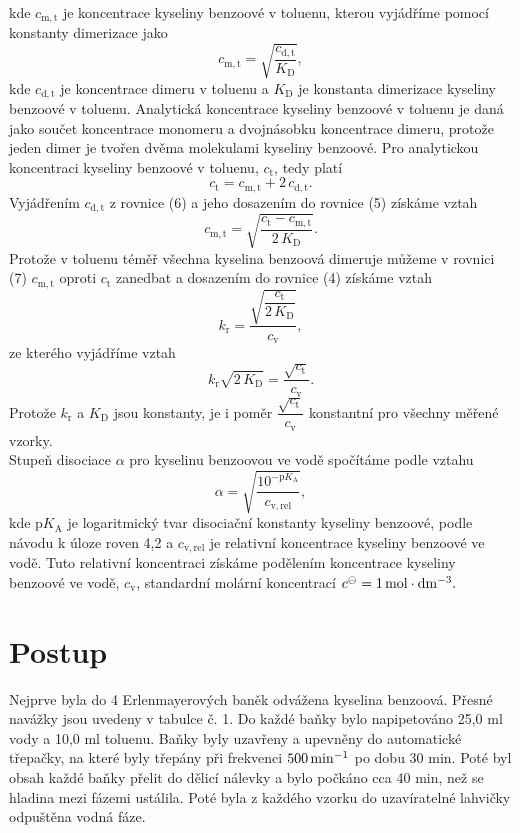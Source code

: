 \documentclass[12pt,a4paper]{article}
\def\ri#1{\mathrm{#1}}
\def\jd#1{\ifmmode\,\mathrm{#1}\else\,\textrm{#1}\fi}
\begin{document}
kde $c_\ri{m, t}$ je koncentrace kyseliny benzoové v toluenu, kterou vyjádříme pomocí konstanty dimerizace jako 
\begin{equation}
	c_\ri{m, t} = \sqrt{\dfrac{c_\ri{d, t}}{K_\ri{D}}},
\end{equation}
kde $c_\ri{d, t}$ je koncentrace dimeru v toluenu a $K_\ri{D}$ je konstanta dimerizace kyseliny benzoové v toluenu. Analytická koncentrace kyseliny benzoové v toluenu je daná jako součet koncentrace monomeru a dvojnásobku koncentrace dimeru, protože jeden dimer je tvořen dvěma molekulami kyseliny benzoové. Pro analytickou koncentraci kyseliny benzoové v toluenu, $c_\ri{t}$, tedy platí
\begin{equation}
	c_\ri{t} = c_\ri{m, t} + 2\,c_\ri{d, t}.
\end{equation}
Vyjádřením $c_\ri{d, t}$ z rovnice (6) a jeho dosazením do rovnice (5) získáme vztah
\begin{equation}
	c_\ri{m, t} = \sqrt{\dfrac{c_\ri{t}-c_\ri{m, t}}{2\,K_\ri{D}}}.
\end{equation}
Protože v toluenu téměř všechna kyselina benzoová dimeruje můžeme v rovnici (7) $c_\ri{m, t}$ oproti $c_\ri{t}$ zanedbat a dosazením do rovnice (4) získáme vztah
\begin{equation}
	k_\ri{r} = \dfrac{\sqrt{\dfrac{c_\ri{t}}{2\,K_\ri{D}}}}{c_\ri{v}},
\end{equation}
ze kterého vyjádříme vztah
\begin{equation}
	k_\ri{r}\sqrt{2\,K_\ri{D}} =  \dfrac{\sqrt{c_\ri{t}}}{c_\ri{v}}.
\end{equation}
Protože $k_\ri{r}$ a $K_\ri{D}$ jsou konstanty, je i poměr $\dfrac{\sqrt{c_\ri{t}}}{c_\ri{v}}$ konstantní pro všechny měřené vzorky.\\
Stupeň disociace $\alpha$ pro kyselinu benzoovou ve vodě spočítáme podle vztahu
\begin{equation}
	\alpha = \sqrt{\dfrac{10^{-\ri{p}K_\ri{A}}}{c_\ri{v, rel}}},
\end{equation}
kde p$K_\ri{A}$ je logaritmický tvar disociační konstanty kyseliny benzoové, podle návodu k úloze roven 4,2 a $c_\ri{v, rel}$ je relativní koncentrace kyseliny benzoové ve vodě. Tuto relativní koncentraci získáme podělením koncentrace kyseliny benzoové ve vodě, $c_\ri{v}$, standardní molární koncentrací $c^\ominus = 1\jd{mol\cdot dm^{-3}}.$
\section*{Postup}
Nejprve byla do 4 Erlenmayerových baněk odvážena kyselina benzoová. Přesné navážky jsou uvedeny v tabulce č. 1. Do každé baňky bylo napipetováno 25,0\jd{ml} vody a 10,0\jd{ml} toluenu. Baňky byly uzavřeny a upevněny do automatické třepačky, na které byly třepány při frekvenci $500\jd{min^{-1}}$ po dobu 30\jd{min}. Poté byl obsah každé baňky přelit do dělicí nálevky a bylo počkáno cca 40\jd{min}, než se hladina mezi fázemi ustálila. Poté byla z každého vzorku do uzavíratelné lahvičky odpuštěna vodná fáze.
\end{document}
